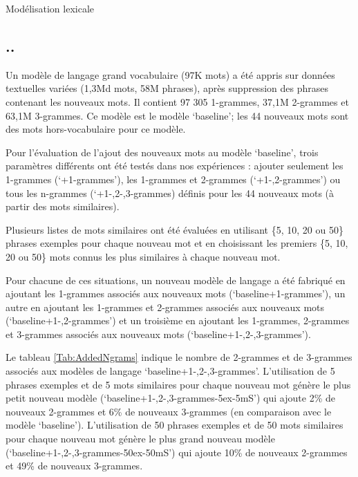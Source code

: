 \documentclass{style/these}
\newcommand{\hiddensubsection}[1]{
    \stepcounter{subsection}
    \subsection*{\arabic{chapter}.\arabic{section}.\arabic{subsection}\hspace{1em}{#1}}
}
\begin{document}
\begin{part}{Modélisation lexicale}
\hiddensubsection{Ajout de mots dans le modèle de langage}

Un modèle de langage grand vocabulaire (97K mots) a été appris sur données textuelles variées (1,3Md mots, 58M phrases), après suppression des phrases contenant les nouveaux mots. 
Il contient  97 305 1-grammes, 37,1M 2-grammes et 63,1M 3-grammes.
Ce modèle est le modèle `baseline'; les 44 nouveaux mots sont des mots hors-vocabulaire pour ce modèle. 

Pour l'évaluation de l'ajout des nouveaux mots au modèle `baseline', trois paramètres différents ont été testés dans nos expériences : ajouter seulement les 1-grammes (`+1-grammes'), les 1-grammes et 2-grammes (`+1-,2-grammes') ou tous les n-grammes (`+1-,2-,3-grammes) définis pour les 44 nouveaux mots (à partir des mots similaires).

Plusieurs listes de mots similaires ont été évaluées en utilisant \{5, 10, 20 ou 50\} phrases exemples pour chaque nouveau mot et en choisissant les premiers \{5, 10, 20 ou 50\} mots connus les plus similaires à chaque nouveau mot.

Pour chacune de ces situations, un nouveau modèle de langage a été fabriqué en ajoutant les 1-grammes associés aux nouveaux mots (`baseline+1-grammes'), un autre en ajoutant les 1-grammes et 2-grammes associés aux nouveaux mots (`baseline+1-,2-grammes') et un troisième en ajoutant les 1-grammes, 2-grammes et 3-grammes associés aux nouveaux mots (`baseline+1-,2-,3-grammes'). 

Le tableau \ref{Tab:AddedNgrams} indique le nombre de 2-grammes et de 3-grammes associés aux modèles de langage `baseline+1-,2-,3-grammes'. 
L'utilisation de 5 phrases exemples et de 5 mots similaires pour chaque nouveau mot génère le plus petit nouveau modèle (`baseline\linebreak+1-,2-,3-grammes-5ex-5mS') qui ajoute 2\% de nouveaux 2-grammes et 6\% de nouveaux 3-grammes (en comparaison avec le modèle `baseline'). L'utilisation de 50 phrases \linebreak exemples et de 50 mots similaires pour chaque nouveau mot génère le plus grand nouveau modèle (`baseline+1-,2-,3-grammes-50ex-50mS') qui ajoute 10\% de nouveaux 2-grammes et 49\% de nouveaux 3-grammes.


\end{part}
\end{document}
